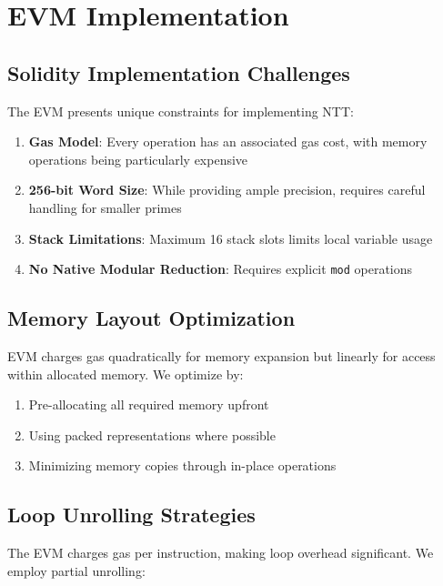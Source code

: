 \section{EVM Implementation}


\subsection{Solidity Implementation Challenges}

The EVM presents unique constraints for implementing NTT:

\begin{enumerate}
\item \textbf{Gas Model}: Every operation has an associated gas cost, with memory operations being particularly expensive
\item \textbf{256-bit Word Size}: While providing ample precision, requires careful handling for smaller primes
\item \textbf{Stack Limitations}: Maximum 16 stack slots limits local variable usage
\item \textbf{No Native Modular Reduction}: Requires explicit \texttt{mod} operations
\end{enumerate}

\subsection{Memory Layout Optimization}

EVM charges gas quadratically for memory expansion but linearly for access within allocated memory. We optimize by:

\begin{enumerate}
\item Pre-allocating all required memory upfront
\item Using packed representations where possible
\item Minimizing memory copies through in-place operations
\end{enumerate}

\subsection{Loop Unrolling Strategies}

The EVM charges gas per instruction, making loop overhead significant. We employ partial unrolling:

